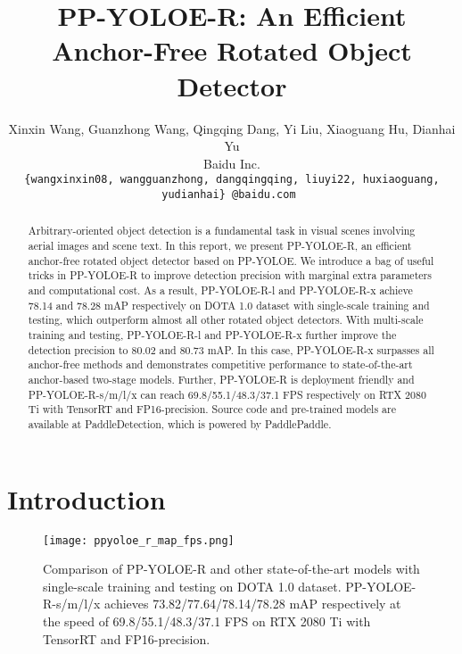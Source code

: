 \documentclass[final]{cvpr}
\begin{document}
\title{PP-YOLOE-R: An Efficient Anchor-Free Rotated Object Detector}

\author{Xinxin Wang, Guanzhong Wang, Qingqing Dang, Yi Liu, Xiaoguang Hu, Dianhai Yu \\
Baidu Inc.\\
\tt\small \{wangxinxin08, wangguanzhong, dangqingqing, liuyi22, huxiaoguang, yudianhai\} @baidu.com
}

\maketitle


\begin{abstract} 

  
  Arbitrary-oriented object detection is a fundamental task in visual scenes involving aerial images and scene text. In this report, we present PP-YOLOE-R, an efficient anchor-free rotated object detector based on PP-YOLOE. We introduce a bag of useful tricks in PP-YOLOE-R to improve detection precision with marginal extra parameters and computational cost. As a result, PP-YOLOE-R-l and PP-YOLOE-R-x achieve 78.14 and 78.28 mAP respectively on DOTA 1.0 dataset with single-scale training and testing, which outperform almost all other rotated object detectors. With multi-scale training and testing, PP-YOLOE-R-l and PP-YOLOE-R-x further improve the detection precision to 80.02 and 80.73 mAP. In this case, PP-YOLOE-R-x surpasses all anchor-free methods and demonstrates competitive performance to state-of-the-art anchor-based two-stage models. Further, PP-YOLOE-R is deployment friendly and PP-YOLOE-R-s/m/l/x can reach 69.8/55.1/48.3/37.1 FPS respectively on RTX 2080 Ti with TensorRT and FP16-precision. Source code and pre-trained models are available at PaddleDetection, which is powered by
  PaddlePaddle.
  
\end{abstract}


\section{Introduction}

\begin{figure}[ht]
\centering
\texttt{[image: ppyoloe\_r\_map\_fps.png]} 
\caption{Comparison of PP-YOLOE-R and other state-of-the-art models with single-scale training and testing on DOTA 1.0 dataset. PP-YOLOE-R-s/m/l/x achieves 73.82/77.64/78.14/78.28 mAP respectively at the speed of 69.8/55.1/48.3/37.1 FPS on RTX 2080 Ti with TensorRT and FP16-precision.}
\label{figure1}
\end{figure}
\end{document}
